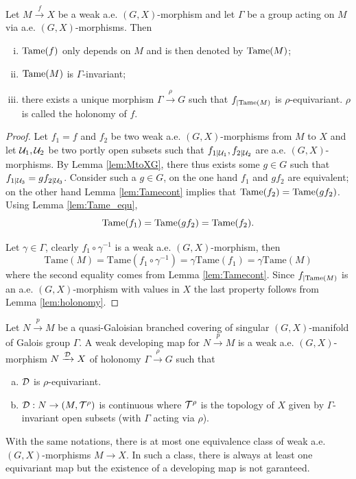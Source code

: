\begin{prop}\label{prop:weak_morphism_group_acting} Let $M\xrightarrow{f} X$ be a weak a.e. $(G,X)$-morphism
and let  $\Gamma$ be a group acting on $M$ via a.e. $(G,X)$-morphisms.
Then
\begin{enumerate}[(i)]
 \item $\mathrm{Tame}(f)$ only depends on $M$ and is then denoted by $\mathrm{Tame}(M)$;
 \item $\mathrm{Tame}(M)$ is $\Gamma$-invariant;
 \item there exists a unique morphism $\Gamma \xrightarrow{\rho} G$ such that $f_{|\mathrm{Tame}(M)}$ is $\rho$-equivariant. $\rho$ is called the holonomy of $f$.
\end{enumerate}
\end{prop}
\begin{proof}

Let $f_1=f$ and $f_2$ be two weak a.e. $(G,X)$-morphisms from $M$ to $X$ and let $\mathcal{U}_1,\mathcal{U}_2$ be two portly open subsets such that $f_{1|\mathcal{U}_1},f_{2|\mathcal{U}_2}$ are a.e. $(G,X)$-morphisms. 
  By Lemma \ref{lem:MtoXG}, there thus exists some $g\in G$ such that $f_{1|\mathcal{U}_3} = gf_{2|\mathcal{U}_3}$. Consider such a $g \in G$, on the one hand  $f_{1}$ and $gf_{2}$ are equivalent; on the other hand Lemma \ref{lem:Tamecont} implies that $\mathrm{Tame}(f_2)=\mathrm{Tame}(gf_2)$. Using  Lemma \ref{lem:Tame_equ}, $$\mathrm{Tame}(f_1)=\mathrm{Tame}(gf_2)=\mathrm{Tame}(f_2).$$

Let $\gamma \in \Gamma$, clearly $f_1\circ \gamma^{-1} $ is a weak a.e. $(G,X)$-morphism, then 
$$\mathrm{Tame}(M)=\mathrm{Tame}(f_1\circ \gamma^{-1}) =  \gamma \mathrm{Tame}(f_1)=\gamma \mathrm{Tame}(M)$$ 
where the second equality comes from Lemma \ref{lem:Tamecont}.
Since  $f_{|\mathrm{Tame}(M)}$ is an a.e. $(G,X)$-morphism with values in $X$ the last property follows from Lemma \ref{lem:holonomy}.
\end{proof}



\begin{defi} \label{defi:weakdevmap}
Let $N\xrightarrow{p} M$ be a quasi-Galoisian branched covering of singular $(G,X)$-manifold of Galois group $\Gamma$. 
A weak developing map for  $N\xrightarrow{p} M$ is a weak a.e. $(G,X)$-morphism $N\xrightarrow{\mathcal{D}} X$ of holonomy $\Gamma \xrightarrow{\rho} G$ such that
\begin{enumerate}[(a)]
 \item $\mathcal{D}$ is $\rho$-equivariant.
 \item $\mathcal{D} : N\rightarrow (M,\mathcal{T}^\rho)$ is continuous  where $\mathcal{T}^\rho$ is the topology of $X$ given by $\Gamma$-invariant open subsets (with $\Gamma$ acting via $\rho$).
\end{enumerate}
\end{defi}
\begin{rem}\label{rem:same_notations_most_one} With the same notations, there is at most one equivalence class of weak a.e. $(G,X)$-morphisms $M\rightarrow X$. In such a class, there is always at least one equivariant map but the existence of a developing map is not garanteed. 
\end{rem}

